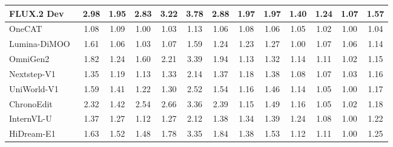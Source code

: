 \documentclass{llmxive}
\begin{document}
\begin{table}[t]
{\begin{tabular}{l|cccccc|cccccc}
            FLUX.2 Dev~\cite{flux-2-2025}
            & 2.98 & 1.95 & 2.83 & 3.22 & 3.78 & \cellcolor[HTML]{C8C8C8} 2.88 & 1.97 & 1.97 & 1.40 & 1.24 & 1.07
            & \cellcolor[HTML]{C8C8C8} 1.57  \\

            \midrule

            OneCAT~\cite{li2025onecat}
            & 1.08 & 1.09 & 1.00 & 1.03 & 1.13 & \cellcolor[HTML]{C8C8C8}1.06 & 1.08 & 1.06 & 1.05 & 1.02 & 1.00
            & \cellcolor[HTML]{C8C8C8}1.04 \\

            Lumina-DiMOO~\cite{xin2025lumina}
            & 1.61 & 1.06 & 1.03 & 1.07 & 1.59 & \cellcolor[HTML]{C8C8C8}1.24  & 1.23 & 1.27 & 1.00 & 1.07 & 1.06
            & \cellcolor[HTML]{C8C8C8}1.14  \\

            OmniGen2~\cite{wu2025omnigen2}
            & 1.82 & 1.24 & 1.60 & 2.21 & 3.39 & \cellcolor[HTML]{C8C8C8}1.94 & 1.13 & 1.32 & 1.14 & 1.11 & 1.02
            & \cellcolor[HTML]{C8C8C8}1.15 \\

            Nextstep-V1~\cite{han2025nextstep}
            & 1.35 & 1.19 & 1.13 & 1.33 & 2.14 & \cellcolor[HTML]{C8C8C8}1.37 & 1.18 & 1.38 & 1.08 & 1.07 & 1.03
            & \cellcolor[HTML]{C8C8C8}1.16 \\

            UniWorld-V1~\cite{lin2025uniworld}
            & 1.59 & 1.41 & 1.22 & 1.30 & 2.52 & \cellcolor[HTML]{C8C8C8}1.54 & 1.16 & 1.46 & 1.14 & 1.05 & 1.00
            & \cellcolor[HTML]{C8C8C8}1.17 \\

            ChronoEdit~\cite{wu2025chronoedit}
            & 2.32 & 1.42 & 2.54 & 2.66 & 3.36 & \cellcolor[HTML]{C8C8C8}2.39 & 1.15 & 1.49 & 1.16 & 1.05 & 1.02
            & \cellcolor[HTML]{C8C8C8}1.18 \\

            InternVL-U~\cite{tian2026internvl}
            & 1.37 & 1.27 & 1.12 & 1.27 & 2.12 & \cellcolor[HTML]{C8C8C8}1.38 & 1.34 & 1.39 & 1.24 & 1.08 & 1.00
            & \cellcolor[HTML]{C8C8C8}1.22 \\

            HiDream-E1~\cite{cai2025hidream}
            & 1.63 & 1.52 & 1.48 & 1.78 & 3.35 & \cellcolor[HTML]{C8C8C8}1.84 & 1.38 & 1.53 & 1.12 & 1.11 & 1.00
            & \cellcolor[HTML]{C8C8C8}1.25 \\


\end{tabular}}
\end{table}
\end{document}
